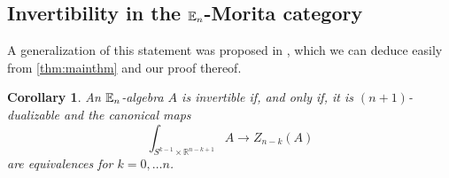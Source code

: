 \documentclass[10pt, reqno, twoside
, final
]{amsart}
\numberwithin{equation}{subsection}%
\theoremstyle{definition}
\theoremstyle{definition}
\theoremstyle{definition}
\theoremstyle{definition}
\theoremstyle{definition}
\theoremstyle{definition}
\theoremstyle{definition}
\theoremstyle{definition}
\theoremstyle{definition}
\theoremstyle{plain}
\theoremstyle{definition}
\theoremstyle{plain}
\theoremstyle{definition}
\theoremstyle{plain}
\newtheorem{cor}[defn]{Corollary}
\theoremstyle{definition}
\theoremstyle{definition}
\theoremstyle{plain}
\theoremstyle{plain}
\theoremstyle{definition}
\theoremstyle{plain}
\theoremstyle{plain}
\theoremstyle{plain}
\begin{document}
\subsection{Invertibility in the $\mathbb{E}_n$-Morita category}




A generalization of this statement was proposed in \cite[Conjecture 1.9]{BJSS}, which we can deduce easily from \ref{thm:mainthm} and our proof thereof.
\begin{cor}\label{cor:invertibility}
An $\mathbb{E}_n$-algebra $A$ is invertible if, and only if,  it is $(n+1)$-dualizable and the canonical  maps
\begin{equation}
    \int_{S^{k-1}\times \mathbb{R}^{n-k+1}} A \longrightarrow Z_{n-k}(A) \label{eq:invert-maps}
\end{equation}
are equivalences for $k=0,\ldots n$.
\end{cor}
\end{document}
